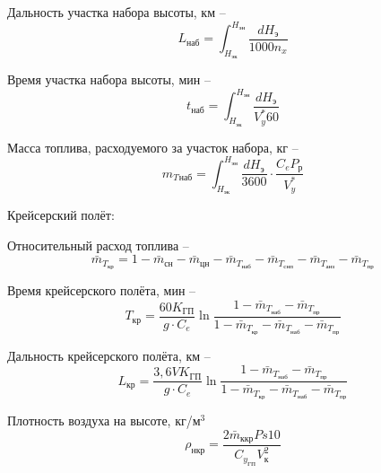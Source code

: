 Дальность участка набора высоты, км -- 
\begin{equation}
    \label{eq:Дальность участка набора высоты}
    L_\text{наб} = \int_{H_\text{эк}}^{H_\text{эн}}\frac{dH_\text{э}}{1000 n_x}
\end{equation}

Время участка набора высоты, мин -- 
\begin{equation}
    \label{eq:Время участка набора высоты}
    t_\text{наб} = \int_{H_\text{эк}}^{H_\text{эн}}\frac{dH_\text{э}}{V_y^* 60}
\end{equation}

Масса топлива, расходуемого за участок набора, кг -- 
\begin{equation}
    \label{eq:Масса топлива, расходуемого за участок набора}
    m_T{_\text{наб}} = \int_{H_\text{эк}}^{H_\text{эн}}\frac{dH_\text{э}}{3600} \cdot \frac{C_eP_\text{р}}{V_y^*}
\end{equation}

\begin{center}
    Крейсерский полёт:
\end{center}

Относительный расход топлива -- 
\begin{equation}
    \label{eq:Относительный расход топлива}
    \bar{m}_{T_\text{кр}} = 1-\bar{m}_\text{сн}-\bar{m}_\text{цн} - \bar{m}_{T_\text{наб}} - \bar{m}_{T_\text{снп}} - \bar{m}_{T_\text{анз}} - \bar{m}_{T_\text{пр}}
\end{equation}

Время крейсерского полёта, мин -- 
\begin{equation}
    \label{eq:Время крейсерского полёта}
    T_\text{кр} = \frac{60 K_\text{ГП}}{g \cdot C_e} \ln{\frac{1 - \bar{m}_{T_\text{наб}} - \bar{m}_{T_\text{пр}}}{1 - \bar{m}_{T_\text{кр}} - \bar{m}_{T_\text{наб}} - \bar{m}_{T_\text{пр}}}}
\end{equation}

Дальность крейсерского полёта, км -- 
\begin{equation}
    \label{eq:Дальность крейсерского полёта}
    L_\text{кр} = \frac{3,6 V K_\text{ГП}}{g \cdot C_e} \ln{\frac{1 - \bar{m}_{T_\text{наб}} - \bar{m}_{T_\text{пр}}}{1 - \bar{m}_{T_\text{кр}} - \bar{m}_{T_\text{наб}} - \bar{m}_{T_\text{пр}}}}
\end{equation}

Плотность воздуха на высоте, кг/м$^3$
\begin{equation}
    \label{eq:Плотность воздуха на высоте}
    \rho_\text{нкр} = \frac{2 \bar{m}_\text{ккр}Ps10}{C_{y_\text{ГП}}V_\text{к}^2}
\end{equation}

